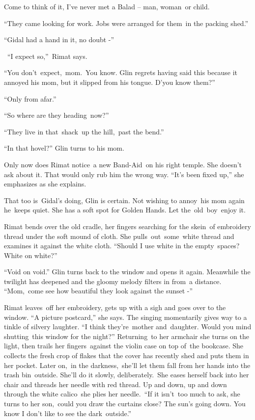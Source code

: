 \documentclass[twoside,11pt]{book}
\begin{document}
{{\textquotedbl}Come to think of it, I've never met a Balad -- man,
woman\ }or child.{\textquotedbl}

{{}``They came looking for work. Jobs were arranged for them\ in the
packing }shed{.''}

{{}``Gidal had a hand in it, no doubt -{}''}

{~``}I expect
so{,''~Rimat says.\ }

{{}``You
don't~}expect,~mom{.~You know.{\textquotedbl} Glin regrets having said
this because it annoyed his  mom, but it slipped from his tongue.
{\textquotedbl}}D{}'y{ou know them?''\ }

{{}``Only from afar.''}

{{}``So where are they heading~now?''}

{{}``They live in that\ shack\ up the
hill,\ }past{ the bend.''}

{{}``In that hovel?'' Glin turns }to his
mom{.}

{Only now does Rimat notice~a new
B}and-Aid\ {on his right temple. She doesn't ask about it. T}hat would
only rub him the wrong way{. ``It's been fixed up,{}'' she emphasizes
as she explains. }\ 

{That too is\ Gidal's doing, Glin is certain. Not wishing to annoy\ his
}mom{ again he\ keeps quiet. She has a soft spot for Golden Hands. Let
the\ }old\ boy\ {enjoy it.}\ 

{Rimat bends over the old cradle, her fingers searching for the
}skein\ {of embroidery thread under the soft mound of cloth. She
pulls\ }out\ some\ {white thread and examines it against the white
cloth. ``Should I use white in the }empty{\ spaces? White on white?''}

{{}``Void on void.{}'' Glin
}turns{ back to the window and opens it again. Meanwhile the twilight
has deepened and the gloomy melody filters in from~a distance. ``Mom,\ come see how beautiful they look against the
sunset -{}''}\ 

{Rimat leaves\ off her embroidery, gets up with a sigh and goes over to
the window. ``A picture postcard,'' she says. The singing momentarily gives way to a tinkle of silvery laughter. ``I
think they're~mother and~daughter}. Would you mind shutting\ this window for the
night?{{}''
}Returning{\ }{to her armchair
she turns on the light, }then trails her fingers\ {against the violin
case on }top of{\ }{the
bookcase. She collects the fresh crop of flakes that the cover has recently shed and
}puts{ them in her pocket. Later on},~in the
darkness,\ {she'll let them fall from her hands into the trash
bin\ }outside{. She'll do it slowly, deliberately.~She eases herself
back into her chair and threads her needle with red thread. Up and down, up and down }through the white calico\ she
{plies her needle.\  ``If it
isn't}{\ }{too much to
ask,{\textquotedbl} she }turns to her son,\ {{\textquotedbl}could you
}draw the curtains close? The sun's going down.{ You know I don't like
to see the dark}\ {outside.''\ }
\end{document}
